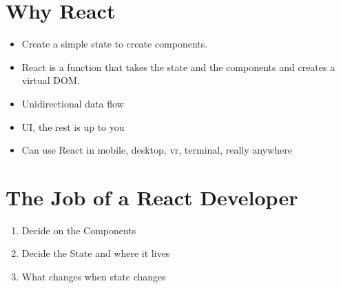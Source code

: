 \documentclass[12pt]{article}
\begin{document}
\section{Why React}
\begin{itemize}
    \item Create a simple state to create components.
    \item React is a function that takes the state and the components and creates
        a virtual DOM.
    \item Unidirectional data flow
    \item UI, the rest is up to you
    \item Can use React in mobile, desktop, vr, terminal, really anywhere
\end{itemize}

\section{The Job of a React Developer}
\begin{enumerate}
    \item Decide on the Components
    \item Decide the State and where it lives
    \item What changes when state changes
\end{enumerate}
\end{document}
